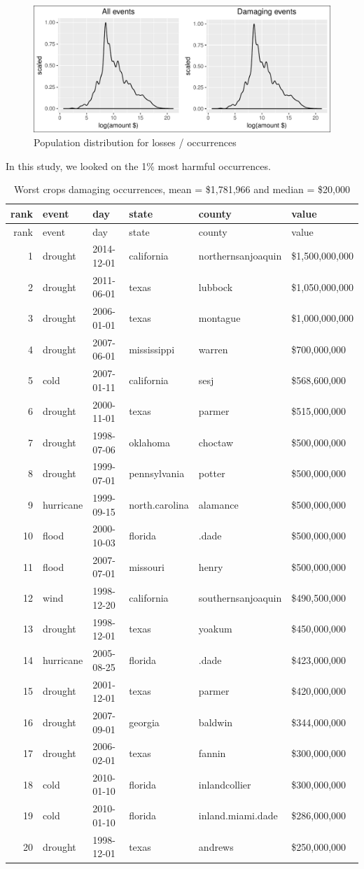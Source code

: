 \documentclass[]{article}
\begin{document}
\begin{figure}[htbp]
\centering
\includegraphics{readme_files/figure-latex/crop-distr-4-1.pdf}
\caption{Population distribution for losses / occurrences}
\end{figure}

In this study, we looked on the 1\% most harmful occurrences.

\begin{longtable}[]{@{}rlllll@{}}
\caption{Worst crops damaging occurrences, mean = \$1,781,966 and median
= \$20,000}\tabularnewline
\toprule
rank & event & day & state & county & value\tabularnewline
\midrule
\endfirsthead
\toprule
rank & event & day & state & county & value\tabularnewline
\midrule
\endhead
1 & drought & 2014-12-01 & california & northernsanjoaquin &
\$1,500,000,000\tabularnewline
2 & drought & 2011-06-01 & texas & lubbock &
\$1,050,000,000\tabularnewline
3 & drought & 2006-01-01 & texas & montague &
\$1,000,000,000\tabularnewline
4 & drought & 2007-06-01 & mississippi & warren &
\$700,000,000\tabularnewline
5 & cold & 2007-01-11 & california & sesj & \$568,600,000\tabularnewline
6 & drought & 2000-11-01 & texas & parmer & \$515,000,000\tabularnewline
7 & drought & 1998-07-06 & oklahoma & choctaw &
\$500,000,000\tabularnewline
8 & drought & 1999-07-01 & pennsylvania & potter &
\$500,000,000\tabularnewline
9 & hurricane & 1999-09-15 & north.carolina & alamance &
\$500,000,000\tabularnewline
10 & flood & 2000-10-03 & florida & .dade & \$500,000,000\tabularnewline
11 & flood & 2007-07-01 & missouri & henry &
\$500,000,000\tabularnewline
12 & wind & 1998-12-20 & california & southernsanjoaquin &
\$490,500,000\tabularnewline
13 & drought & 1998-12-01 & texas & yoakum &
\$450,000,000\tabularnewline
14 & hurricane & 2005-08-25 & florida & .dade &
\$423,000,000\tabularnewline
15 & drought & 2001-12-01 & texas & parmer &
\$420,000,000\tabularnewline
16 & drought & 2007-09-01 & georgia & baldwin &
\$344,000,000\tabularnewline
17 & drought & 2006-02-01 & texas & fannin &
\$300,000,000\tabularnewline
18 & cold & 2010-01-10 & florida & inlandcollier &
\$300,000,000\tabularnewline
19 & cold & 2010-01-10 & florida & inland.miami.dade &
\$286,000,000\tabularnewline
20 & drought & 1998-12-01 & texas & andrews &
\$250,000,000\tabularnewline
\bottomrule
\end{longtable}
\end{document}
